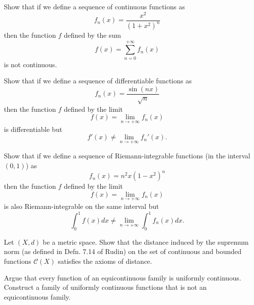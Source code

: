 \documentclass[11pt]{article}%
\begin{document}
\begin{Exercise} [title={*$\dagger$}]
	Show that if we define a sequence of continuous functions as $$f_n(x) = \frac{x^2}{(1+x^2)^n}$$ then the function $f$ defined by the sum
	$$f(x) = \sum_{n=0}^{+\infty}f_n(x)$$
	is not continuous.
\end{Exercise}

\begin{Exercise} [title={*$\dagger$}]
	Show that if we define a sequence of differentiable functions as $$f_n(x) = \frac{\sin(nx)}{\sqrt n}$$ then the function $f$ defined by the limit
	$$f(x) = \lim_{n\to+\infty} f_n(x)$$
	is differentiable but $$f'(x)\neq \lim_{n\to+\infty} f_n'(x).$$
\end{Exercise}

\begin{Exercise} [title={*$\dagger$}]
	Show that if we define a sequence of Riemann-integrable functions (in the interval $(0,1)$) as $$f_n(x) = n^2x(1-x^2)^n$$ then the function $f$ defined by the limit
	$$f(x) = \lim_{n\to+\infty} f_n(x)$$
	is also Riemann-integrable on the same interval but $$\int_0^1 f(x)dx\neq \lim_{n\to+\infty} \int_0^1 f_n(x) dx.$$
\end{Exercise}

\begin{Exercise}[title=*]
	Let $(X,d)$ be a metric space. Show that the distance induced by the supremum norm (as defined in Defn. 7.14 of Rudin) on the set of continuous and bounded functions $\mathcal{C}(X)$ satisfies the axioms of distance.
\end{Exercise}

\begin{Exercise}[title={*}]
	Argue that every function of an equicontinuous family is uniformly continuous. Construct a family of uniformly continuous functions that is not an equicontinuous family.
\end{Exercise}
\end{document}
